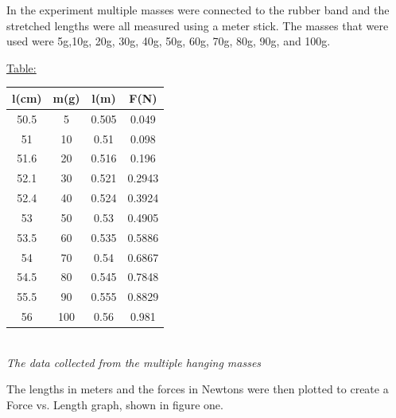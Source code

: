 \documentclass[aps,letterpaper,11pt]{revtex4}
\begin{document}
In the experiment multiple masses were connected to the rubber band and the stretched lengths were all measured using a meter stick. The masses that were used were 5g,10g, 20g, 30g, 40g, 50g, 60g, 70g, 80g, 90g, and 100g.  
\newpage

\begin{center}
\underline{Table:}\\
\begin{tabular}{|c|c|c|c|}
\hline
l(cm) & m(g)& l(m)& F(N)\\
\hline
50.5 & 5 & 0.505 & 0.049\\
\hline
51 & 10 & 0.51 & 0.098\\
\hline
51.6 & 20 & 0.516 & 0.196\\
\hline
52.1 & 30 & 0.521 & 0.2943\\
\hline
52.4 & 40 & 0.524 & 0.3924\\
\hline
53 & 50 & 0.53 & 0.4905\\
\hline
53.5 & 60 & 0.535 & 0.5886\\
\hline
54 & 70 & 0.54 & 0.6867\\
\hline
54.5 & 80 & 0.545 & 0.7848\\
\hline
55.5 & 90 & 0.555 & 0.8829\\
\hline
56 & 100 & 0.56 & 0.981\\
\hline 
\end{tabular}
\\
\vspace{5mm}
\textit{The data collected from the multiple hanging masses}
\end{center}

The lengths in meters and the forces in Newtons were then plotted to create a Force vs. Length graph, shown in figure one.

\newpage
\end{document}
